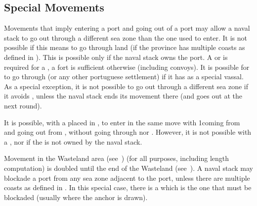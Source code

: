 \subsection{Special Movements}
\label{chMilitary:Movement:Port Multiple
  Coasts} Movements that imply entering a port and going out of a port
may allow a naval stack to go out through a different sea zone than the
one used to enter.
\bparag It is not possible if this means to go through land (if the
province has multiple coasts as defined in ).
\bparag This is possible only if the naval stack owns the port. A \COL
or \TP is required for a \FLEET, a fort is sufficient otherwise
(including convoys).
\bparag[Portugal] It is possible for \SPA to go through  (or any other portuguese settlement) if it has 
as a special vassal.
 As a special exception, it is not possible to go out
through a different sea zone if it avoids , unless the
naval stack ends its movement there (and goes out at the next round).
\begin{exemple}It is possible, with a \TP placed in , to
  enter in the same move with 1\NWD coming from  and
  going out from , without going through
   nor . However, it is not
  possible with a \FLEET, nor if the \TP is not owned by the naval
  stack.
\end{exemple}
\aparag[Wasteland]\label{chMilitary:Movement:Wasteland} Movement in the
Wasteland area (see~) (for all purposes,
including \LoS length computation) is doubled until the end of the
Wasteland (see~).
\label{chMilitary:Movement:Blockading
  Multiple Coasts} A naval stack may blockade a port from any sea zone
adjacent to the port, unless there are multiple coasts as defined in
.
\bparag In this special case, there is a  which is the
one that must be blockaded (usually where the anchor is drawn).

